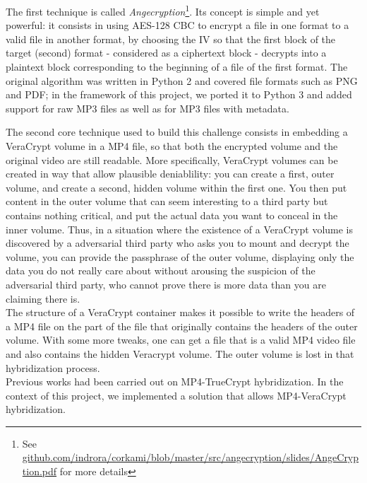 \documentclass[12pt,a4paper]{article}
\begin{document}
    The first technique is called \textit{Angecryption}\footnote{See \href{https://github.com/indrora/corkami/blob/master/src/angecryption/slides/AngeCryption.pdf}{github.com/indrora/corkami/blob/master/src/angecryption/slides/AngeCryption.pdf} for more details}.
    Its concept is simple and yet powerful: it consists in using AES-128 CBC to
    encrypt a file in one format to a valid file in another format, by choosing
    the IV so that the first block of the target (second) format - considered
    as a ciphertext block - decrypts into a plaintext block corresponding to
    the beginning of a file of the first format. The original algorithm was
    written in Python 2 and covered file formats such as PNG and PDF; in the
    framework of this project, we ported it to Python 3 and added support for
    raw MP3 files as well as for MP3 files with metadata.

    The second core technique used to build this challenge consists in embedding
    a VeraCrypt volume in a MP4 file, so that both the encrypted volume and the
    original video are still readable. More specifically, VeraCrypt volumes can
    be created in way that allow plausible deniablility: you can create a
    first, outer volume, and create a second, hidden volume within the first
    one. You then put content in the outer volume that can seem interesting to a
    third party but contains nothing critical, and put the actual data you
    want to conceal in the inner volume. Thus, in a situation where the
    existence of a VeraCrypt volume is discovered by a adversarial third
    party who asks you to mount and decrypt the volume, you can provide the
    passphrase of the outer volume, displaying only the data you do not really
    care about without arousing the suspicion of the adversarial third party,
    who cannot prove there is more data than you are claiming there is.\\
    \indent The structure of a VeraCrypt container makes it possible to write
    the headers of a MP4 file on the part of the file that originally contains
    the headers of the outer volume. With some more tweaks, one can get a file
    that is a valid MP4 video file and also contains the hidden Veracrypt volume.
    The outer volume is lost in that hybridization process.\\
    \indent Previous works had been carried out on MP4-TrueCrypt hybridization.
    In the context of this project, we implemented a solution that allows
    MP4-VeraCrypt hybridization.\\
\end{document}
